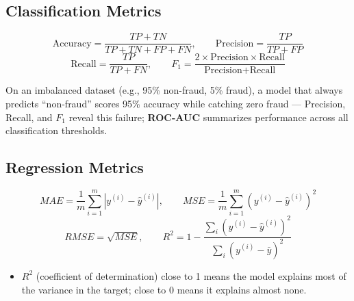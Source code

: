\documentclass[11pt,a4paper]{article}
\begin{document}
\subsection{Classification Metrics}
\begin{center}
\end{center}
$$
\text{Accuracy} = \frac{TP+TN}{TP+TN+FP+FN}, \qquad \text{Precision} = \frac{TP}{TP+FP}
$$
$$
\text{Recall} = \frac{TP}{TP+FN}, \qquad F_1 = \frac{2 \times \text{Precision} \times \text{Recall}}{\text{Precision} + \text{Recall}}
$$
\begin{conceptbox}
On an imbalanced dataset (e.g., 95\% non-fraud, 5\% fraud), a model that always predicts ``non-fraud'' scores 95\% accuracy while catching zero fraud --- Precision, Recall, and $F_1$ reveal this failure; \textbf{ROC-AUC} summarizes performance across all classification thresholds.
\end{conceptbox}

\subsection{Regression Metrics}
$$
MAE = \frac{1}{m}\sum_{i=1}^{m}\left|y^{(i)}-\hat{y}^{(i)}\right|, \qquad
MSE = \frac{1}{m}\sum_{i=1}^{m}\left(y^{(i)}-\hat{y}^{(i)}\right)^2
$$
$$
RMSE = \sqrt{MSE}, \qquad R^2 = 1 - \frac{\sum_i (y^{(i)}-\hat{y}^{(i)})^2}{\sum_i (y^{(i)}-\bar{y})^2}
$$
\begin{itemize}[leftmargin=*]
  \item $R^2$ (coefficient of determination) close to 1 means the model explains most of the variance in the target; close to 0 means it explains almost none.
\end{itemize}

\end{document}
